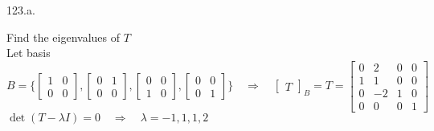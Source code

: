 \documentclass[12pt]{book}
\begin{document}
\begin{CJK}{UTF8}{bsmi}
123.a. \begin{minipage}[t]{\dimexpr\linewidth-2em}
Find the eigenvalues of $T$ \\
Let basis $B=\{\begin{bmatrix}
1&0\\0&0
\end{bmatrix},\begin{bmatrix}
0&1\\0&0
\end{bmatrix},\begin{bmatrix}
0&0\\1&0
\end{bmatrix},\begin{bmatrix}
0&0\\0&1
\end{bmatrix}\}\quad\Rightarrow\quad\begin{bmatrix}
T
\end{bmatrix}_B=T=\begin{bmatrix}
0&2&0&0\\1&1&0&0\\0&-2&1&0\\0&0&0&1
\end{bmatrix}$ \\
$\det(T-\lambda I)=0\quad\Rightarrow\quad\lambda=-1, 1, 1, 2$
\end{minipage}\\


\end{CJK}
\end{document}
